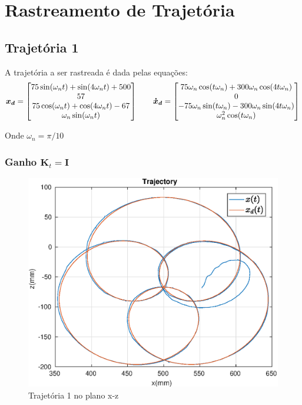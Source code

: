 \section{Rastreamento de Trajetória}

\subsection{Trajetória 1}
A trajetória a ser rastreada é dada pelas equações:
\begin{gather}
\bm{x_d} = \begin{bmatrix}75 \sin(\omega_n t) + \sin (4 \omega_n t) + 500 \\ 57 \\ 75 \cos(\omega_n t) + \cos(4\omega_n t) -67 \\ \omega_n \sin(\omega_nt) \end{bmatrix}
\qquad
\bm{\dot{x}_d} = \begin{bmatrix}75\omega_n \cos(t\omega_n) + 300 \omega_n \cos(4t\omega_n) \\
0 \\
-75 \omega_n \sin(t \omega_n) - 300 \omega_n \sin(4t\omega_n) \\
\omega_n^2 \cos(t \omega_n)\end{bmatrix}
\end{gather}

Onde $\omega_n = \pi/10$

\subsubsection{Ganho $\bm{K}_t = \bm{I}$}

\begin{figure}[H]
\centering
  \includegraphics[width=0.5\linewidth]{./img/traj_1_k1/traj.eps}
  \caption{Trajetória 1 no plano x-z}
  \label{fig:sub1}
\end{figure}%

